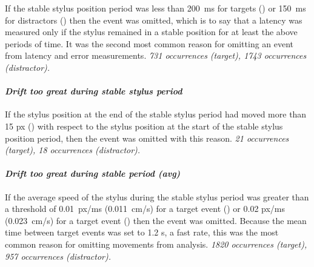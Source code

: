 If the stable stylus position period was less than 200~ms for targets
() or 150~ms for distractors
() then the event was
omitted, which is to say that a latency was measured only if the
stylus remained in a stable position for at least the above periods of
time. It was the second most common reason for omitting an event from
latency and error measurements. \emph{731 occurrences (target), 1743
  occurrences (distractor).}



\paragraph{\emph{Drift too great during stable stylus period}}
If the stylus position at the end of the stable stylus period had
moved more than 15 px () with respect
to the stylus position at the start of the stable stylus position
period, then the event was omitted with this reason.  \emph{21
  occurrences (target), 18 occurrences (distractor).}

\paragraph{\emph{Drift too great during stable period (avg)}} If
the average speed of the stylus during the stable stylus period was
greater than a threshold of 0.01~px/ms (0.011~cm/s) for a target event
() or 0.02 px/ms (0.023~cm/s) for
a target event () then the
event was omitted. Because the mean time between target events was set
to 1.2 s, a fast rate, this was the most common reason for omitting
movements from analysis. \emph{1820 occurrences (target), 957
  occurrences (distractor).}

